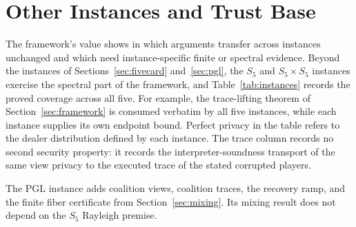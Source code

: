 \documentclass[runningheads]{llncs}
\begin{document}
\section{Other Instances and Trust Base}\label{sec:instances}

The framework's value shows in which arguments transfer across instances
unchanged and which need instance-specific finite or spectral evidence.
Beyond the instances of Sections~\ref{sec:fivecard} and~\ref{sec:pgl}, the
$S_5$ and $S_5\times S_5$ instances exercise the spectral part of the
framework, and Table~\ref{tab:instances} records the proved coverage
across all five. For example, the trace-lifting theorem of
Section~\ref{sec:framework} is consumed verbatim by all five instances,
while each instance supplies its own endpoint bound. Perfect privacy in
the table refers to the dealer distribution defined by each
instance.
The trace column records no second security property: it records the
interpreter-soundness transport of the same view privacy to the executed
trace of the stated corrupted players.

The PGL instance adds coalition views, coalition traces, the recovery ramp,
and the finite fiber certificate from Section~\ref{sec:mixing}. Its mixing
result does not depend on the $S_5$ Rayleigh premise.
\end{document}
